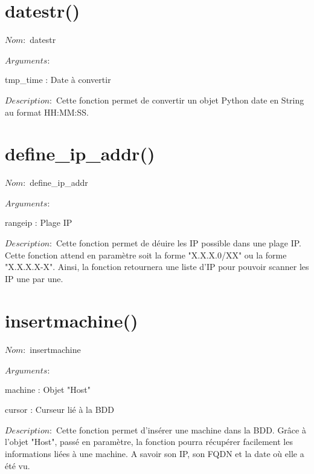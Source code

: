 \documentclass[12pt]{report}
\begin{document}
		\section{datestr()}
			{\setlength{\parindent}{0cm}
			$Nom :$ datestr\\\\
			}
			$Arguments :$
			\begin{description}
				\item tmp\_time : Date à convertir\\
			\end{description}
			$Description : $ Cette fonction permet de convertir un objet Python date en String au format HH:MM:SS.
		\section{define\_ip\_addr()}
			{\setlength{\parindent}{0cm}
			$Nom :$ define\_ip\_addr\\\\
			}
			$Arguments :$
			\begin{description}
				\item rangeip : Plage IP\\
			\end{description}
			$Description : $ Cette fonction permet de déuire les IP possible dans une plage IP. Cette fonction attend en paramètre soit la forme "X.X.X.0/XX" ou la forme "X.X.X.X-X". Ainsi, la fonction retournera une liste d'IP pour pouvoir scanner les IP une par une.
		\section{insertmachine()}
			{\setlength{\parindent}{0cm}
			$Nom :$ insertmachine\\\\
			}
			$Arguments :$
			\begin{description}
				\item machine : Objet "Host"
				\item cursor : Curseur lié à la BDD\\
			\end{description}
			$Description : $ Cette fonction permet d'insérer une machine dans la BDD. Grâce à l'objet "Host", passé en paramètre, la fonction pourra récupérer facilement les informations liées à une machine. A savoir son IP, son FQDN et la date où elle a été vu.
\end{document}
